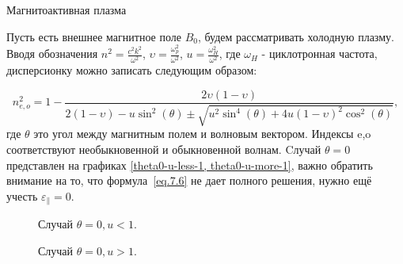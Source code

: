 \documentclass[10pt, a4paper]{article}
\numberwithin{equation}{section}
\begin{document}
Магнитоактивная плазма

Пусть есть внешнее магнитное поле $B_0$, будем рассматривать холодную плазму. Вводя обозначения $n^2=\frac{c^2 k^2}{\omega^2}$, $\upsilon=\frac{\omega_p^2}{\omega^2}$, $u=\frac{\omega_H^2}{\omega^2}$, где $\omega_H$ - циклотронная частота,
дисперсионку можно записать следующим образом:

\begin{equation}
    \label{eq.7.6}
    n_{e,o}^2=1-\frac{2\upsilon (1-\upsilon)}{2(1-\upsilon) - u \sin^2(\theta) \pm \sqrt{u^2 \sin^4(\theta) + 4u(1-\upsilon)^2 \cos^2(\theta)}}, 
\end{equation}
где $\theta$ это угол между магнитным полем и волновым вектором. Индексы e,o соответствуют необыкновенной и обыкновенной волнам.
Cлучай $\theta=0$ представлен на графиках \ref{theta0-u-less-1, theta0-u-more-1}, важно обратить внимание на то, что формула~\ref{eq.7.6} не дает полного решения, нужно ещё учесть $\varepsilon_{\parallel}=0$.

\begin{figure}[h!]
    \caption{\label{theta0-u-less-1} Случай $\theta=0, u < 1$.}
\end{figure}

\begin{figure}[h!]
    \caption{\label{theta0-u-more-1} Случай $\theta=0, u > 1$.}
\end{figure}
\end{document}
